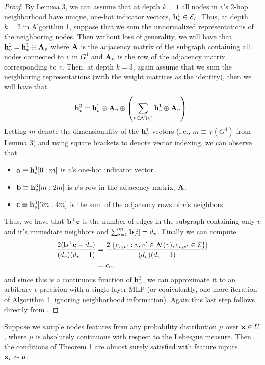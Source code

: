 \begin{proof}
By Lemma 3, we can assume that at depth $k=1$ all nodes in $v$'s 2-hop neighborhood have unique, one-hot indicator vectors, $\mathbf{h}^1_v \in \mathcal{E}_I$. 
Thus, at depth $k=2$ in Algorithm 1, suppose that we sum the unnormalized representations of the neighboring nodes. Then without loss of generality, we will have that $\mathbf{h}^{2}_v = \mathbf{h}^1_v \oplus \mathbf{A}_{v}$ where $\mathbf{A}$ is the adjacency matrix of the subgraph containing all nodes connected to $v$ in $G^4$ and $\mathbf{A}_v$ is the row of the adjacency matrix corresponding to $v$. 
Then, at depth $k=3$, again assume that we sum the neighboring representations (with the weight matrices as the identity), then we will have that 
\begin{equation}
\mathbf{h}_v^3 = \mathbf{h}^1_v \oplus \mathbf{A}_{v} \oplus \left(\sum_{v \in \mathcal{N}(v)} \mathbf{h}^1_v \oplus \mathbf{A}_{v}\right).
\end{equation}
Letting $m$ denote the dimensionality of the $\mathbf{h}^1_v$ vectors (i.e., $m \equiv \chi(G^4)$ from Lemma 3) and using square brackets to denote vector indexing, we can observe that
\begin{itemize}
\item
	$\mathbf{a} \equiv \mathbf{h}^3_v[0:m]$ is $v$'s one-hot indicator vector. 
\item
	$\mathbf{b} \equiv \mathbf{h}^3_v[m:2m]$ is $v$'s row in the adjacency matrix, $\mathbf{A}$.
\item
	$\mathbf{c} \equiv \mathbf{h}^3_v[3m:4m]$ is the sum of the adjacency rows of $v$'s neighbors. 
\end{itemize}

Thus, we have that $\mathbf{b}^\top\mathbf{c}$ is the number of edges in the subgraph containing only $v$ and it's immediate neighbors and $\sum_{i=0}^{m}\mathbf{b}[i] = d_v$.
Finally we can compute
\begin{align}
\frac{2(\mathbf{b}^\top\mathbf{c} - d_v)}{(d_v)(d_v - 1)}  &= \frac{2 | \{ e_{v,v'} : v, v' \in \mathcal{N}(v), e_{v,v'} \in \mathcal{E} \}|}{(d_v)(d_v - 1)}\\
&=c_v,
\end{align}
and since this is a continuous function of $\mathbf{h}^{3}_v$, we can approximate it to an arbitrary $\epsilon$ precision with a single-layer MLP (or equivalently, one more iteration of Algorithm 1, ignoring neighborhood information). 
Again this last step follows directly from \cite{hornik1991approximation}.
\end{proof}

\renewcommand{\thetheorem}{2}
\begin{corollary}
Suppose we sample nodes features from any probability distribution $\mu$ over $\mathbf{x} \in U$, where $\mu$ is absolutely continuous with respect to the Lebesgue measure. Then the conditions of Theorem 1 are almost surely satisfied with feature inputs $\mathbf{x}_v \sim \mu$. 
\end{corollary}

